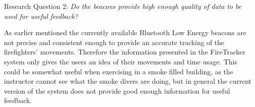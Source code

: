 \documentclass[../Main/thesis.tex]{subfiles}
\begin{document}
Research Question 2: \textit{Do the beacons provide high enough quality of data to be used for useful feedback?}

As earlier mentioned the currently available Bluetooth Low Energy beacons are not precise and consistent enough to provide an accurate tracking of the firefighters' movements.
Therefore the information presented in the FireTracker system only gives the users an idea of their movements and time usage.
This could be somewhat useful when exercising in a smoke filled building, as the instructor cannot see what the smoke divers are doing, but in general the current version of the system does not provide good enough information for useful feedback.
\end{document}

